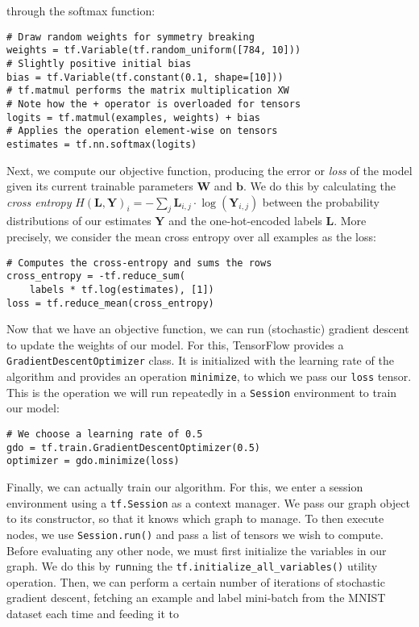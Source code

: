 through the softmax function:
%
\begin{lstlisting}
# Draw random weights for symmetry breaking
weights = tf.Variable(tf.random_uniform([784, 10]))
# Slightly positive initial bias
bias = tf.Variable(tf.constant(0.1, shape=[10]))
# tf.matmul performs the matrix multiplication XW
# Note how the + operator is overloaded for tensors
logits = tf.matmul(examples, weights) + bias
# Applies the operation element-wise on tensors
estimates = tf.nn.softmax(logits)
\end{lstlisting}
%
Next, we compute our objective function, producing the error or \emph{loss} of
the model given its current trainable parameters $\mathbf{W}$ and
$\mathbf{b}$. We do this by calculating the \emph{cross entropy}
$H(\mathbf{L}, \mathbf{Y})_i = -\sum_j \mathbf{L}_{i,j} \cdot
\log(\mathbf{Y}_{i,j})$ between the probability distributions of our estimates
$\mathbf{Y}$ and the one-hot-encoded labels $\mathbf{L}$. More precisely, we
consider the mean cross entropy over all examples as the loss:
%
\begin{lstlisting}
# Computes the cross-entropy and sums the rows
cross_entropy = -tf.reduce_sum(
    labels * tf.log(estimates), [1])
loss = tf.reduce_mean(cross_entropy)
\end{lstlisting}
%
Now that we have an objective function, we can run (stochastic) gradient descent
to update the weights of our model. For this, TensorFlow provides a
\texttt{GradientDescentOptimizer} class. It is initialized with the
learning rate of the algorithm and provides an operation \texttt{minimize}, to
which we pass our \texttt{loss} tensor. This is the operation we will run
repeatedly in a \texttt{Session} environment to train our model:
%
\begin{lstlisting}
# We choose a learning rate of 0.5
gdo = tf.train.GradientDescentOptimizer(0.5)
optimizer = gdo.minimize(loss)
\end{lstlisting}
%
Finally, we can actually train our algorithm. For this, we enter a session
environment using a \texttt{tf.Session} as a context manager. We pass our graph
object to its constructor, so that it knows which graph to manage. To then
execute nodes, we use \texttt{Session.run()} and pass a list of tensors we wish
to compute. Before evaluating any other node, we must first initialize the
variables in our graph. We do this by \texttt{run}ning the
\texttt{tf.initialize\_all\_variables()} utility operation. Then, we can perform
a certain number of iterations of stochastic gradient descent, fetching an
example and label mini-batch from the MNIST dataset each time and feeding it to
